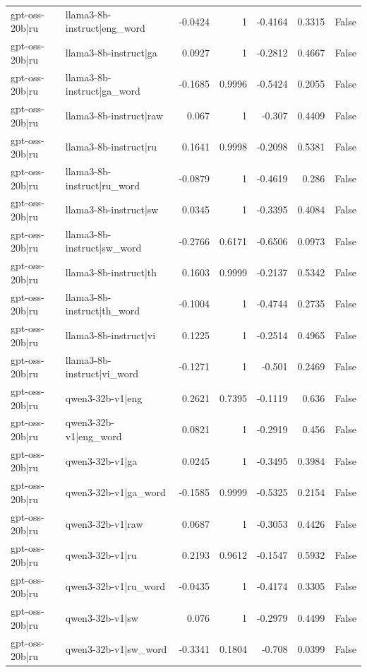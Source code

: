 \begin{table}
\begin{tabular}{l l r r r r l}
gpt-oss-20b|ru & llama3-8b-instruct|eng_word & -0.0424 & 1 & -0.4164 & 0.3315 & False \\
gpt-oss-20b|ru & llama3-8b-instruct|ga & 0.0927 & 1 & -0.2812 & 0.4667 & False \\
gpt-oss-20b|ru & llama3-8b-instruct|ga_word & -0.1685 & 0.9996 & -0.5424 & 0.2055 & False \\
gpt-oss-20b|ru & llama3-8b-instruct|raw & 0.067 & 1 & -0.307 & 0.4409 & False \\
gpt-oss-20b|ru & llama3-8b-instruct|ru & 0.1641 & 0.9998 & -0.2098 & 0.5381 & False \\
gpt-oss-20b|ru & llama3-8b-instruct|ru_word & -0.0879 & 1 & -0.4619 & 0.286 & False \\
gpt-oss-20b|ru & llama3-8b-instruct|sw & 0.0345 & 1 & -0.3395 & 0.4084 & False \\
gpt-oss-20b|ru & llama3-8b-instruct|sw_word & -0.2766 & 0.6171 & -0.6506 & 0.0973 & False \\
gpt-oss-20b|ru & llama3-8b-instruct|th & 0.1603 & 0.9999 & -0.2137 & 0.5342 & False \\
gpt-oss-20b|ru & llama3-8b-instruct|th_word & -0.1004 & 1 & -0.4744 & 0.2735 & False \\
gpt-oss-20b|ru & llama3-8b-instruct|vi & 0.1225 & 1 & -0.2514 & 0.4965 & False \\
gpt-oss-20b|ru & llama3-8b-instruct|vi_word & -0.1271 & 1 & -0.501 & 0.2469 & False \\
gpt-oss-20b|ru & qwen3-32b-v1|eng & 0.2621 & 0.7395 & -0.1119 & 0.636 & False \\
gpt-oss-20b|ru & qwen3-32b-v1|eng_word & 0.0821 & 1 & -0.2919 & 0.456 & False \\
gpt-oss-20b|ru & qwen3-32b-v1|ga & 0.0245 & 1 & -0.3495 & 0.3984 & False \\
gpt-oss-20b|ru & qwen3-32b-v1|ga_word & -0.1585 & 0.9999 & -0.5325 & 0.2154 & False \\
gpt-oss-20b|ru & qwen3-32b-v1|raw & 0.0687 & 1 & -0.3053 & 0.4426 & False \\
gpt-oss-20b|ru & qwen3-32b-v1|ru & 0.2193 & 0.9612 & -0.1547 & 0.5932 & False \\
gpt-oss-20b|ru & qwen3-32b-v1|ru_word & -0.0435 & 1 & -0.4174 & 0.3305 & False \\
gpt-oss-20b|ru & qwen3-32b-v1|sw & 0.076 & 1 & -0.2979 & 0.4499 & False \\
gpt-oss-20b|ru & qwen3-32b-v1|sw_word & -0.3341 & 0.1804 & -0.708 & 0.0399 & False \\

\end{tabular}
\end{table}
